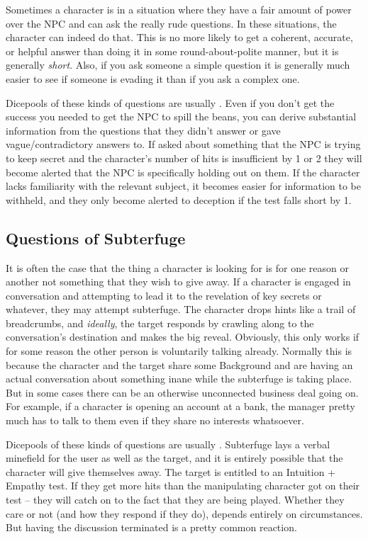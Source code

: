 Sometimes a character is in a situation where they have a fair amount of power over the NPC and can ask the really rude questions. In these situations, the character can indeed do that. This is no more likely to get a coherent, accurate, or helpful answer than doing it in some round-about-polite manner, but it is generally \textit{short}. Also, if you ask someone a simple question it is generally much easier to see if someone is evading it than if you ask a complex one.

Dicepools of these kinds of questions are usually . Even if you don't get the success you needed to get the NPC to spill the beans, you can derive substantial information from the questions that they didn't answer or gave vague/contradictory answers to. If asked about something that the NPC is trying to keep secret and the character's number of hits is insufficient by 1 or 2 they will become alerted that the NPC is specifically holding out on them. If the character lacks familiarity with the relevant subject, it becomes easier for information to be withheld, and they only become alerted to deception if the test falls short by 1.

\subsection{Questions of Subterfuge}

It is often the case that the thing a character is looking for is for one reason or another not something that they wish to give away. If a character is engaged in conversation and attempting to lead it to the revelation of key secrets or whatever, they may attempt subterfuge. The character drops hints like a trail of breadcrumbs, and \textit{ideally}, the target responds by crawling along to the conversation's destination and makes the big reveal. Obviously, this only works if for some reason the other person is voluntarily talking already. Normally this is because the character and the target share some Background and are having an actual conversation about something inane while the subterfuge is taking place. But in some cases there can be an otherwise unconnected business deal going on. For example, if a character is opening an account at a bank, the manager pretty much has to talk to them even if they share no interests whatsoever.

Dicepools of these kinds of questions are usually . Subterfuge lays a verbal minefield for the user as well as the target, and it is entirely possible that the character will give themselves away. The target is entitled to an Intuition + Empathy test. If they get more hits than the manipulating character got on their test -- they will catch on to the fact that they are being played. Whether they care or not (and how they respond if they do), depends entirely on circumstances. But having the discussion terminated is a pretty common reaction.

